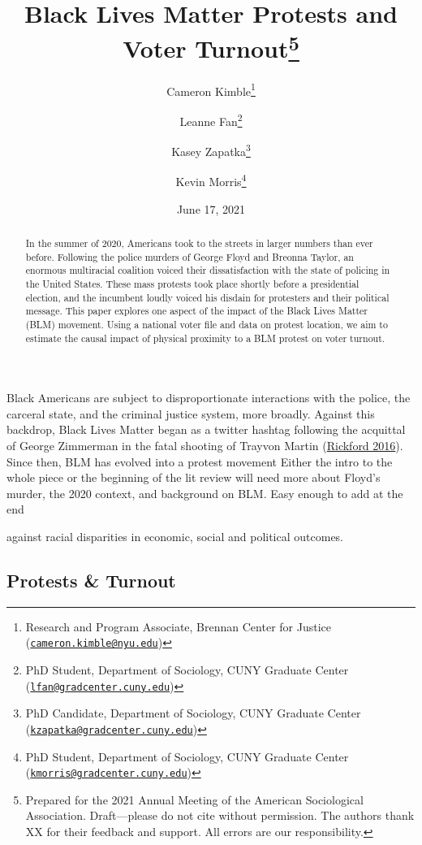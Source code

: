 \documentclass[
  12pt,
]{article}
\title{Black Lives Matter Protests and Voter Turnout\thanks{Prepared for the 2021 Annual Meeting of the American Sociological Association. Draft---please do not cite without permission. The authors thank XX for their feedback and support. All errors are our responsibility.}}
\author{Cameron Kimble\footnote{Research and Program Associate, Brennan Center for Justice (\href{mailto:cameron.kimble@nyu.edu}{\nolinkurl{cameron.kimble@nyu.edu}})} \and Leanne Fan\footnote{PhD Student, Department of Sociology, CUNY Graduate Center (\href{mailto:lfan@gradcenter.cuny.edu}{\nolinkurl{lfan@gradcenter.cuny.edu}})} \and Kasey Zapatka\footnote{PhD Candidate, Department of Sociology, CUNY Graduate Center (\href{mailto:kzapatka@gradcenter.cuny.edu}{\nolinkurl{kzapatka@gradcenter.cuny.edu}})} \and Kevin Morris\footnote{PhD Student, Department of Sociology, CUNY Graduate Center (\href{mailto:kmorris@gradcenter.cuny.edu}{\nolinkurl{kmorris@gradcenter.cuny.edu}})}}
\date{June 17, 2021}
\begin{document}
\maketitle
\begin{abstract}
In the summer of 2020, Americans took to the streets in larger numbers than ever before. Following the police murders of George Floyd and Breonna Taylor, an enormous multiracial coalition voiced their dissatisfaction with the state of policing in the United States. These mass protests took place shortly before a presidential election, and the incumbent loudly voiced his disdain for protesters and their political message. This paper explores one aspect of the impact of the Black Lives Matter (BLM) movement. Using a national voter file and data on protest location, we aim to estimate the causal impact of physical proximity to a BLM protest on voter turnout.
\end{abstract}

\pagebreak
\doublespacing


Black Americans are subject to disproportionate interactions with the police, the carceral state, and the criminal justice system, more broadly. Against this backdrop, Black Lives Matter began as a twitter hashtag following the acquittal of George Zimmerman in the fatal shooting of Trayvon Martin (\protect\hyperlink{ref-Rickford2016}{Rickford 2016}). Since then, BLM has evolved into a protest movement Either the intro to the whole piece or the beginning of the lit review will need more about Floyd's murder, the 2020 context, and background on BLM. Easy enough to add at the end

against racial disparities in economic, social and political outcomes.

\hypertarget{protests-turnout}{%
\subsection*{Protests \& Turnout}\label{protests-turnout}}
\end{document}
